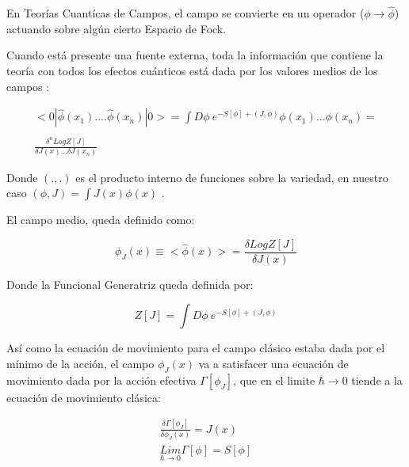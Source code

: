 En Teorías Cuantícas de Campos, el campo se convierte en un operador ($\phi \rightarrow \hat{\phi}$) actuando sobre algún cierto Espacio de Fock.   %



Cuando está presente una fuente externa, toda la información que contiene la teoría con todos los efectos cuánticos está dada por los valores medios de los campos :

\begin{equation}
\begin{array}{c}
< 0 | \hat{ \phi  } (x _1) .... \hat{\phi  } (x _n) | 0 > = 
\int D \phi \ e ^{- S[ \phi ] + (J, \phi )} \phi (x _1) ... \phi (x _n) = \\ \\
\frac{\delta ^n Log Z[J] }{ \delta J(x) ... \delta J(x _n) }
\end{array}
\end{equation}

Donde $(.,.) $ es el producto interno de funciones sobre la variedad, en nuestro caso $(\phi,J) = \int J(x) \phi (x)$ .

El campo medio, queda definido como:

\begin{equation}
\phi _J (x) \equiv < \hat{\phi } (x) > = \frac{\delta Log Z[J] }{\delta J(x)} 
\end{equation}

Donde la Funcional Generatriz queda definida por:

\begin{equation}
Z [J] = 
\int D \phi \ e ^{- S[ \phi ] + (J, \phi )}
\end{equation}

Así como la ecuación de movimiento para el campo clásico estaba dada por el mínimo de la acción, el campo $ \phi _J (x) $ va a satisfacer una ecuación de movimiento dada por la acción efectiva $ \Gamma [\phi _J] $, que en el limite $\hbar \rightarrow 0$ tiende a la ecuación de movimiento clásica:


\begin{equation}
\begin{array}{c}
\frac{\delta \Gamma [ \phi _J ]  }{\delta \phi _J (x)  } = 
J (x) \\
\underset{ \hbar \rightarrow 0 }{ Lim  } \Gamma [ \phi  ] = S [ \phi ]
\end{array}
\label{eq.acción1}
\end{equation}

